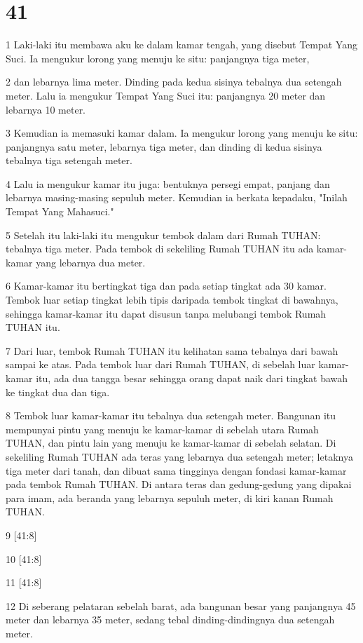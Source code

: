 \chapter{41}

\par 1 Laki-laki itu membawa aku ke dalam kamar tengah, yang disebut Tempat Yang Suci. Ia mengukur lorong yang menuju ke situ: panjangnya tiga meter,
\par 2 dan lebarnya lima meter. Dinding pada kedua sisinya tebalnya dua setengah meter. Lalu ia mengukur Tempat Yang Suci itu: panjangnya 20 meter dan lebarnya 10 meter.
\par 3 Kemudian ia memasuki kamar dalam. Ia mengukur lorong yang menuju ke situ: panjangnya satu meter, lebarnya tiga meter, dan dinding di kedua sisinya tebalnya tiga setengah meter.
\par 4 Lalu ia mengukur kamar itu juga: bentuknya persegi empat, panjang dan lebarnya masing-masing sepuluh meter. Kemudian ia berkata kepadaku, "Inilah Tempat Yang Mahasuci."
\par 5 Setelah itu laki-laki itu mengukur tembok dalam dari Rumah TUHAN: tebalnya tiga meter. Pada tembok di sekeliling Rumah TUHAN itu ada kamar-kamar yang lebarnya dua meter.
\par 6 Kamar-kamar itu bertingkat tiga dan pada setiap tingkat ada 30 kamar. Tembok luar setiap tingkat lebih tipis daripada tembok tingkat di bawahnya, sehingga kamar-kamar itu dapat disusun tanpa melubangi tembok Rumah TUHAN itu.
\par 7 Dari luar, tembok Rumah TUHAN itu kelihatan sama tebalnya dari bawah sampai ke atas. Pada tembok luar dari Rumah TUHAN, di sebelah luar kamar-kamar itu, ada dua tangga besar sehingga orang dapat naik dari tingkat bawah ke tingkat dua dan tiga.
\par 8 Tembok luar kamar-kamar itu tebalnya dua setengah meter. Bangunan itu mempunyai pintu yang menuju ke kamar-kamar di sebelah utara Rumah TUHAN, dan pintu lain yang menuju ke kamar-kamar di sebelah selatan. Di sekeliling Rumah TUHAN ada teras yang lebarnya dua setengah meter; letaknya tiga meter dari tanah, dan dibuat sama tingginya dengan fondasi kamar-kamar pada tembok Rumah TUHAN. Di antara teras dan gedung-gedung yang dipakai para imam, ada beranda yang lebarnya sepuluh meter, di kiri kanan Rumah TUHAN.
\par 9 [41:8]
\par 10 [41:8]
\par 11 [41:8]
\par 12 Di seberang pelataran sebelah barat, ada bangunan besar yang panjangnya 45 meter dan lebarnya 35 meter, sedang tebal dinding-dindingnya dua setengah meter.
